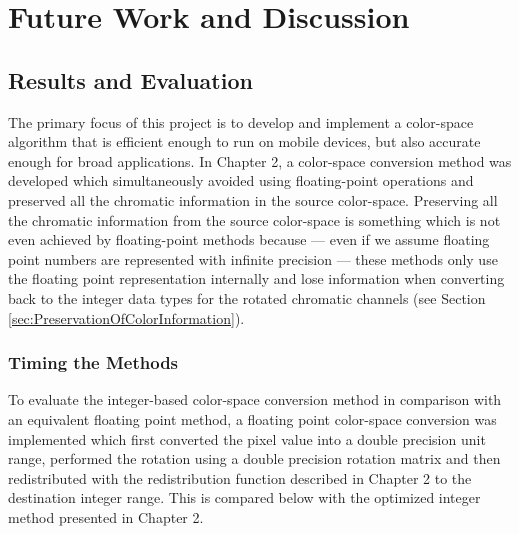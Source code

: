 
\chapter{Future Work and Discussion}

\ifpdf
    \graphicspath{{Chapter5/Figs/Raster/}{Chapter5/Figs/PDF/}{Chapter5/Figs/}}
\else
    \graphicspath{{Chapter5/Figs/Vector/}{Chapter5/Figs/}}
\fi
\section{Results and Evaluation}\label{sec:ResultsAndEvaluation}

The primary focus of this project is to develop and implement a color-space algorithm that is efficient enough to run on mobile devices, but also accurate enough for broad applications. In Chapter 2, a color-space conversion method was developed which simultaneously avoided using floating-point operations and preserved all the chromatic information in the source color-space. Preserving all the chromatic information from the source color-space is something which is not even achieved by floating-point methods because --- even if we assume floating point numbers are represented with infinite precision --- these methods only use the floating point representation internally and lose information when converting back to the integer data types for the rotated chromatic channels (see Section \ref{sec:PreservationOfColorInformation}). 



\subsection{Timing the Methods}\label{sec:TimingTheMethods}

To evaluate the integer-based color-space conversion method in comparison with an equivalent floating point method, a floating point color-space conversion was implemented which first converted the pixel value into a double precision unit range, performed the rotation using a double precision rotation matrix and then redistributed with the redistribution function described in Chapter 2 to the destination integer range. This is compared below with the optimized integer method presented in Chapter 2.

